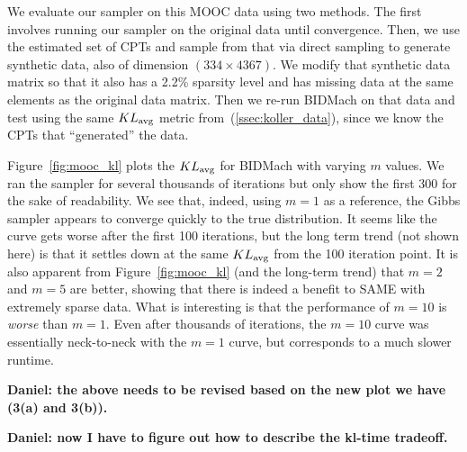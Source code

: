 \documentclass{article} %
\begin{document}
We evaluate our sampler on this MOOC data using two methods. The first involves running our sampler
on the original data until convergence. Then, we use the estimated set of CPTs and sample from that
via direct sampling to generate synthetic data, also of dimension $(334 \times 4367)$. We modify
that synthetic data matrix so that it also has a 2.2\% sparsity level and has missing data at the
same elements as the original data matrix. Then we re-run BIDMach on that data and test using the
same $KL_{\rm avg}$ metric from~(\ref{ssec:koller_data}), since we know the CPTs that ``generated''
the data.

Figure~\ref{fig:mooc_kl} plots the $KL_{\rm avg}$ for BIDMach with varying $m$ values. We ran the
sampler for several thousands of iterations but only show the first 300 for the sake of readability.
We see that, indeed, using $m=1$ as a reference, the Gibbs sampler appears to converge quickly to
the true distribution. It seems like the curve gets worse after the first 100 iterations, but
the long term trend (not shown here) is that it settles down at the same $KL_{\rm avg}$ from the 100
iteration point. It is also apparent from Figure~\ref{fig:mooc_kl} (and the long-term trend) that
$m=2$ and $m=5$ are better, showing that there is indeed a benefit to SAME with extremely sparse
data. What is interesting is that the performance of $m=10$ is \emph{worse} than $m=1$. Even after
thousands of iterations, the $m=10$ curve was essentially neck-to-neck with the $m=1$ curve, but
corresponds to a much slower runtime.

\textbf{Daniel: the above needs to be revised based on the new plot we have (3(a) and 3(b)).}

\textbf{Daniel: now I have to figure out how to describe the kl-time tradeoff.}
\end{document}
